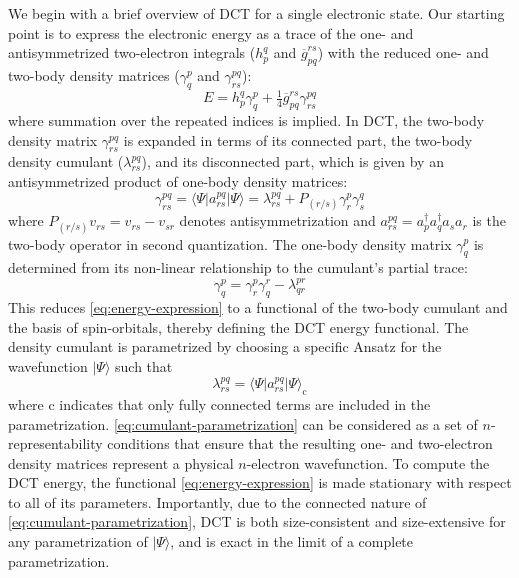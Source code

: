 We begin with a brief overview of DCT for a single electronic state.
Our starting point is to express the electronic energy as a trace of the one-
and antisymmetrized two-electron integrals (\( h_p^q \) and
\(\overline{g}_{pq}^{rs}\)) with the reduced one- and two-body density matrices
(\(\gamma^p_q\) and \(\gamma^{pq}_{rs}\)):
\begin{equation}
    \label{eq:energy-expression}
    E
    =
    h_p^q
    \gamma^p_q
    +
    \tfrac{1}{4}
    \overline{g}_{pq}^{rs}
    \gamma^{pq}_{rs}
\end{equation}
where summation over the repeated indices is implied.
In DCT, the two-body density matrix \(\gamma^{pq}_{rs}\) is expanded in terms of
its connected part, the two-body density cumulant ($\lambda^{pq}_{rs}$), and its
disconnected part, which is given by an antisymmetrized product of one-body
density matrices:\cite{Kutzelnigg:2006p171101}
\begin{equation}
    \label{eq:two-body-n-rep}
    \gamma^{pq}_{rs}
    =
    \langle\Psi|
    a^{pq}_{rs}
    |\Psi\rangle
    =
    \lambda^{pq}_{rs}
    +
    P_{(r/s)}
    \gamma^p_r
    \gamma^q_s
\end{equation}
where \(P_{(r/s)}v_{rs} = v_{rs} - v_{sr}\) denotes antisymmetrization and
\mbox{$a^{pq}_{rs}=a^{\dag}_{p}a^{\dag}_{q}a^{}_{s}a^{}_{r}$} is the two-body operator in second quantization.
The one-body density matrix \(\gamma^p_q\) is determined from its non-linear
relationship to the cumulant's partial trace:\cite{Sokolov:2013p024107}
\begin{equation}
    \label{eq:one-body-n-rep}
    \gamma^p_q
    =
    \gamma^p_r
    \gamma^r_q
    -
    \lambda^{pr}_{qr}
\end{equation}
This reduces \cref{eq:energy-expression} to a functional of the two-body
cumulant and the basis of spin-orbitals, thereby defining the DCT energy
functional.
The density cumulant is parametrized by choosing a specific Ansatz for the
wavefunction \(|\Psi\rangle\) such that\cite{Sokolov:2014p074111}
\begin{equation}
    \label{eq:cumulant-parametrization}
    \lambda^{pq}_{rs}
    =
    \langle\Psi|
    a^{pq}_{rs}
    |\Psi\rangle_\mathrm{c}
\end{equation}
where $\mathrm{c}$ indicates that only fully connected terms are included in the
parametrization.
\cref{eq:cumulant-parametrization} can be considered as a set of
\(n\)-representability conditions that ensure that the resulting one- and
two-electron density matrices represent a physical \(n\)-electron wavefunction.
To compute the DCT energy, the functional \eqref{eq:energy-expression} is made
stationary with respect to all of its parameters.
Importantly, due to the connected nature of \cref{eq:cumulant-parametrization},
DCT is both size-consistent and size-extensive for any parametrization of
\(|\Psi\rangle\), and is exact in the limit of a complete
parametrization.\cite{Sokolov:2014p074111}

